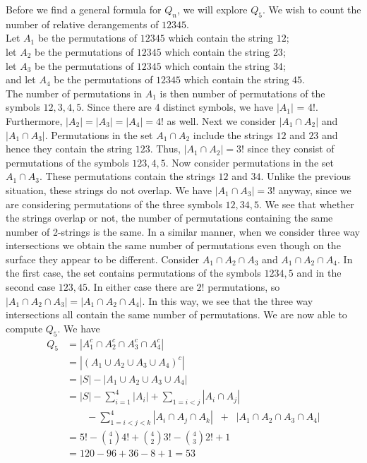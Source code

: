 \documentclass[handout]{ximera}
\begin{document}
Before we find a general formula for $Q_n$, we will explore $Q_5$. 
We wish to count the number of relative derangements of $12345$.\\
Let $A_1$ be the permutations of $12345$ which contain the string $12$;\\
let $A_2$ be the permutations of $12345$ which contain the string $23$;\\
let $A_3$ be the permutations of $12345$ which contain the string $34$;\\
and let $A_4$ be the permutations of $12345$ which contain the string $45$.\\
The number of permutations in $A_1$ is then number of permutations of the symbols $12, 3, 4, 5$.  
Since there are 4 distinct symbols, we have $|A_1|$ = 4!. Furthermore, $|A_2| = |A_3| = |A_4| = 4!$ as well.
Next we consider $|A_1 \cap A_2|$ and $|A_1 \cap A_3|$. Permutations in the set $A_1 \cap A_2$ include 
the strings $12$ and $23$ and hence they contain the string $123$. Thus, $|A_1 \cap A_2| = 3!$ since they 
consist of permutations of the symbols $123, 4, 5$. Now consider permutations in the set $A_1 \cap A_3$. 
These permutations contain the strings $12$ and $34$.  Unlike the previous situation, these strings do 
not overlap. We have $|A_1 \cap A_3| = 3!$ anyway, since we are considering permutations of the three 
symbols $12, 34, 5$. We see that whether the strings overlap or not, the number of permutations containing 
the same number of 2-strings is the same. In a similar manner, when we consider three way intersections
we obtain the same number of permutations even though on the surface they appear to be different.
Consider $A_1 \cap A_2 \cap A_3$ and $A_1 \cap A_2 \cap A_4$. In the first case, the set contains permutations of the symbols $1234, 5$ and in the second case $123, 45$.  In either case there are $2!$ permutations, so
$|A_1 \cap A_2 \cap A_3|=|A_1 \cap A_2 \cap A_4|$.  In this way, we see that the three way 
intersections all contain the same number of permutations. We are now able to compute $Q_5$. We have
\begin{align*}
Q_5 &= |A_1^c \cap A_2^c \cap A_3^c \cap A_4^c|\\
    &= |(A_1 \cup A_2 \cup A_3 \cup A_4)^c|\\
    &= |S| - |A_1 \cup A_2 \cup A_3 \cup A_4|\\
    &= |S| - \sum_{i =1}^4 |A_i| + \sum_{1=i<j}|A_i \cap A_j|\\
    & \qquad  - \sum_{1 = i <j<k}^4 |A_i \cap A_j \cap A_k| \;\;+\;\; |A_1 \cap A_2 \cap A_3 \cap A_4|\\
    &= 5! - \binom{4}{1}4! + \binom{4}{2} 3! - \binom{4}{3}2! + 1\\
    &= 120 - 96 + 36 - 8 +1 = 53
 \end{align*}
    
\end{document}
